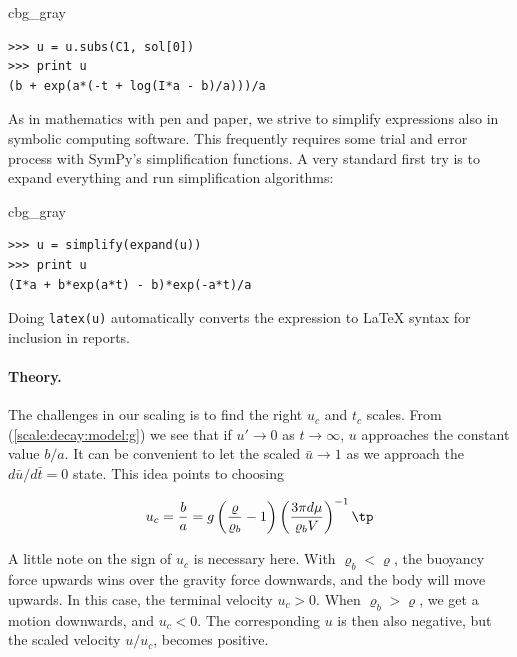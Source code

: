 \documentclass[graybox,envcountchap,sectrefs,final]{svmonodo}
\newenvironment{_cod_tight}[1]{
   \def\FrameCommand{\colorbox{#1}}
   \FrameRule0.6pt\MakeFramed {\FrameRestore}\vskip3mm}
   {\vskip0mm\endMakeFramed}
\newenvironment{cod}[1]{
\bgroup\rmfamily
\fboxsep=0mm\relax
\begin{_cod_tight}{#1}
\list{}{\parsep=-2mm\parskip=0mm\topsep=0pt\leftmargin=2mm
\rightmargin=2\leftmargin\leftmargin=4pt\relax}
\item\relax}
{\endlist\end{_cod_tight}\egroup}
\newenvironment{notice_mdfboxadmon}[1][]{
\begin{notice_mdfboxmdframed}[frametitle=#1]
}
{
\end{notice_mdfboxmdframed}
}
\begin{document}
\begin{notice_mdfboxadmon}
\begin{cod}{cbg_gray}\begin{Verbatim}[numbers=none,fontsize=\fontsize{9pt}{9pt},baselinestretch=0.95,xleftmargin=2mm]
>>> u = u.subs(C1, sol[0])
>>> print u
(b + exp(a*(-t + log(I*a - b)/a)))/a
\end{Verbatim}
\end{cod}
\noindent
As in mathematics with pen and paper, we strive to simplify
expressions also in symbolic computing software.
This frequently requires some trial and error
process with SymPy's simplification functions. A very standard
first try is to expand everything and run simplification algorithms:

\begin{cod}{cbg_gray}\begin{Verbatim}[numbers=none,fontsize=\fontsize{9pt}{9pt},baselinestretch=0.95,xleftmargin=2mm]
>>> u = simplify(expand(u))
>>> print u
(I*a + b*exp(a*t) - b)*exp(-a*t)/a
\end{Verbatim}
\end{cod}
\noindent
Doing \texttt{latex(u)} automatically converts the expression to {\LaTeX} syntax
for inclusion in reports.
\end{notice_mdfboxadmon}



\paragraph{Theory.}
The challenges in our scaling is to find the right $u_c$ and $t_c$
scales. From (\ref{scale:decay:model:g}) we see that if $u'\rightarrow 0$
as $t\rightarrow\infty$, $u$ approaches the constant value $b/a$. It can be
convenient to let the scaled $\bar u\rightarrow 1$ as
we approach the $d\bar u/d\bar t = 0$ state. This idea points to choosing

\begin{equation}
u_c = \frac{b}{a} = g\left(\frac{\varrho}{\varrho_b} -1\right)\left(\frac{3\pi d\mu}{\varrho_b V}\right)^{-1}
\tp
\end{equation}


\begin{notice_mdfboxadmon}
A little note on the sign of $u_c$ is necessary here.
With $\varrho_b < \varrho$, the buoyancy force upwards wins over the
gravity force downwards, and the body will move upwards. In this case,
the terminal velocity $u_c > 0$. When $\varrho_b > \varrho$, we get
a motion downwards, and $u_c < 0$. The corresponding $u$ is then also
negative, but the scaled velocity $u/u_c$, becomes positive.
\end{notice_mdfboxadmon}
\end{document}
